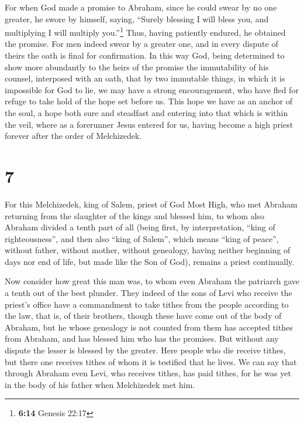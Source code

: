  For when God made a promise to Abraham, since he could
swear by no one greater, he swore by himself,  saying,
``Surely blessing I will bless you, and multiplying I will multiply
you.''\footnote{\textbf{6:14} Genesis 22:17}  Thus,
having patiently endured, he obtained the promise.  For
men indeed swear by a greater one, and in every dispute of theirs the
oath is final for confirmation.  In this way God, being
determined to show more abundantly to the heirs of the promise the
immutability of his counsel, interposed with an oath, 
that by two immutable things, in which it is impossible for God to lie,
we may have a strong encouragement, who have fled for refuge to take
hold of the hope set before us.  This hope we have as an
anchor of the soul, a hope both sure and steadfast and entering into
that which is within the veil,  where as a forerunner
Jesus entered for us, having become a high priest forever after the
order of Melchizedek.

\hypertarget{section-6}{%
\section{7}\label{section-6}}

 For this Melchizedek, king of Salem, priest of God Most
High, who met Abraham returning from the slaughter of the kings and
blessed him,  to whom also Abraham divided a tenth part of
all (being first, by interpretation, ``king of righteousness'', and then
also ``king of Salem'', which means ``king of peace'', 
without father, without mother, without genealogy, having neither
beginning of days nor end of life, but made like the Son of God),
remains a priest continually.

 Now consider how great this man was, to whom even Abraham
the patriarch gave a tenth out of the best plunder.  They
indeed of the sons of Levi who receive the priest's office have a
commandment to take tithes from the people according to the law, that
is, of their brothers, though these have come out of the body of
Abraham,  but he whose genealogy is not counted from them
has accepted tithes from Abraham, and has blessed him who has the
promises.  But without any dispute the lesser is blessed
by the greater.  Here people who die receive tithes, but
there one receives tithes of whom it is testified that he lives.
 We can say that through Abraham even Levi, who receives
tithes, has paid tithes,  for he was yet in the body of
his father when Melchizedek met him.

